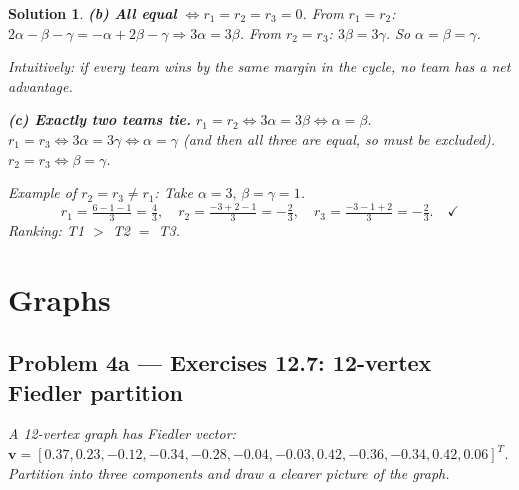 \documentclass[11pt,a4paper]{article}
\theoremstyle{sol}
\newtheorem*{solution}{Solution}
\begin{document}
\begin{solution}
\textbf{(b) All equal} $\iff r_1=r_2=r_3=0$. From $r_1=r_2$: $2\alpha-\beta-\gamma=-\alpha+2\beta-\gamma\Rightarrow3\alpha=3\beta$. From $r_2=r_3$: $3\beta=3\gamma$. So $\alpha=\beta=\gamma$.

Intuitively: if every team wins by the same margin in the cycle, no team has a net advantage.

\textbf{(c) Exactly two teams tie.}
$r_1=r_2\iff 3\alpha=3\beta\iff\alpha=\beta$.
$r_1=r_3\iff 3\alpha=3\gamma\iff\alpha=\gamma$ (and then all three are equal, so must be excluded).
$r_2=r_3\iff\beta=\gamma$.

\textit{Example of $r_2=r_3\neq r_1$:} Take $\alpha=3,\,\beta=\gamma=1$.
\[
r_1=\tfrac{6-1-1}{3}=\tfrac{4}{3},\quad r_2=\tfrac{-3+2-1}{3}=-\tfrac{2}{3},\quad r_3=\tfrac{-3-1+2}{3}=-\tfrac{2}{3}.\quad\checkmark
\]
Ranking: T1 $>$ T2 $=$ T3.
\end{solution}

\clearpage
\section{Graphs}

\subsection*{Problem 4a --- Exercises 12.7: 12-vertex Fiedler partition}
\textit{A 12-vertex graph has Fiedler vector:
$\mathbf{v}=[0.37,0.23,-0.12,-0.34,-0.28,-0.04,-0.03,0.42,-0.36,-0.34,0.42,0.06]^T$.
Partition into three components and draw a clearer picture of the graph.}
\end{document}
